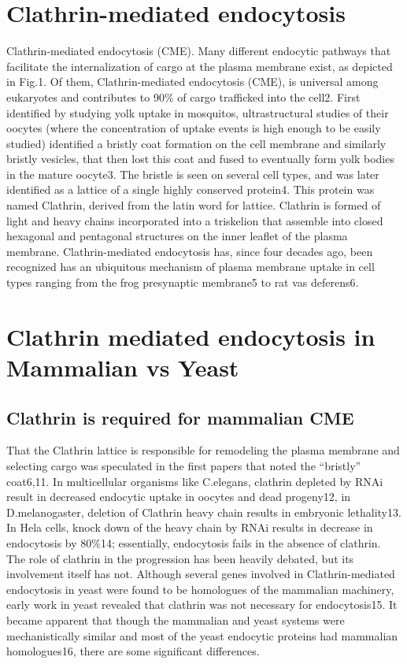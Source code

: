\section{Clathrin-mediated endocytosis}
	Clathrin-mediated endocytosis (CME).
Many different endocytic pathways that facilitate the internalization of cargo at the plasma membrane exist, as depicted in Fig.1. Of them, Clathrin-mediated endocytosis (CME), is universal among eukaryotes and contributes to 90\% of cargo trafficked into the cell2. First identified by studying yolk uptake in mosquitos, ultrastructural studies of their oocytes (where the concentration of uptake events is high enough to be easily studied) identified a bristly coat formation on the cell membrane and similarly bristly vesicles, that then lost this coat and fused to eventually form yolk bodies in the mature oocyte3. The bristle is seen on several cell types, and was later identified as a lattice of a single highly conserved protein4. This protein was named Clathrin, derived from the latin word for lattice. Clathrin is formed of light and heavy chains incorporated into a triskelion that assemble into closed hexagonal and pentagonal structures on the inner leaflet of the plasma membrane. Clathrin-mediated endocytosis has, since four decades ago, been recognized has an ubiquitous mechanism of plasma membrane uptake in cell types ranging from the frog presynaptic membrane5 to rat vas deferens6. 

	
\section{Clathrin mediated endocytosis in Mammalian vs Yeast}
		\subsection{Clathrin is required for mammalian CME}
That the Clathrin lattice is responsible for remodeling the plasma membrane and selecting cargo was speculated in the first papers that noted the “bristly” coat6,11.  In multicellular organisms like C.elegans, clathrin depleted by RNAi result in decreased endocytic uptake in oocytes and dead progeny12, in D.melanogaster, deletion of Clathrin heavy chain results in embryonic lethality13. In Hela cells, knock down of the heavy chain by RNAi results in decrease in endocytosis by 80\%14; essentially, endocytosis fails in the absence of clathrin. The role of clathrin in the progression has been heavily debated, but its involvement itself has not. Although several genes involved in Clathrin-mediated endocytosis in yeast were found to be homologues of the mammalian machinery, early work in yeast revealed that clathrin was not necessary for endocytosis15. It became apparent that though the mammalian and yeast systems were mechanistically similar and most of the yeast endocytic proteins had mammalian homologues16, there are some significant differences. 

